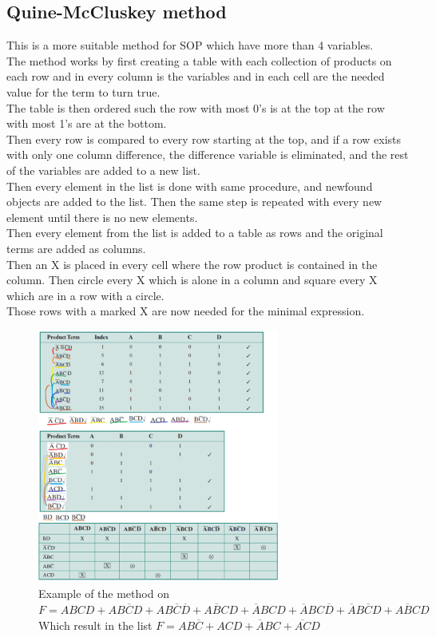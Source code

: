\documentclass[12pt, a4paper]{article}
\begin{document}
			\subsection{Quine-McCluskey method}
				This is a more suitable method for SOP which have more than 4 variables.\\
				The method works by first creating a table with each collection of products on each row and in every column is the variables and in each cell are the needed value for the term to turn true.\\
				The table is then ordered such the row with most 0's is at the top at the row with most 1's are at the bottom.\\
				Then every row is compared to every row starting at the top, and if a row exists with only one column difference, the difference variable is eliminated, and the rest of the variables are added to a new list.\\
				Then every element in the list is done with same procedure, and newfound objects are added to the list. Then the same step is repeated with every new element until there is no new elements.\\
				Then every element from the list is added to a table as rows and the original terms are added as columns.\\
				Then an X is placed in every cell where the row product is contained in the column. Then circle every X which is alone in a column and square every X which are in a row with a circle.\\
				Those rows with a marked X are now needed for the minimal expression.
				\begin{figure}[h!]
					\includegraphics[width=300px]{assets/quine-McCluskey.png}
					\centering
					\caption{Example of the method on \\$F=ABCD+AB\overline{C}D+AB\overline{C}\overline{D}+A\overline{B}CD+\overline{A}BCD+\overline{A}BC\overline{D}+\overline{A}B\overline{C}D+\overline{ABC}D$\\
					Which result in the list $F=AB\overline{C}+ACD+\overline{A}BC+\overline{AC}D$}
				\end{figure}
\end{document}
